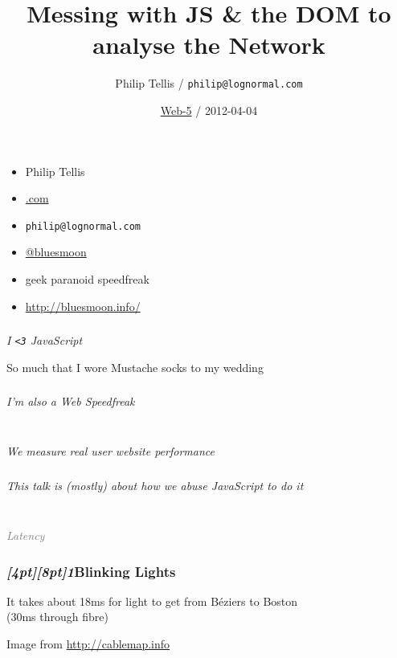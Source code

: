 \documentclass{beamer}
\author{Philip Tellis / \texttt{philip@lognormal.com}}
\title{Messing with JS \& the DOM to analyse the Network}
\date{\href{http://web-5.org/}{Web-5} / 2012-04-04}
\newcommand{\sn}[1]{\textrm{\textit{\Huge{\raisebox{-3pt}[4pt][8pt]{\textcolor{f2elblue}{#1}}}}}\hspace{4pt}}
\newcommand{\innersplash}[1]{
  \begin{center}
    \large \textrm{\textit{ #1 } }
  \end{center}
}
\newcommand{\splashslide}[2][{}]{
  \begin{frame}
  \frametitle{#1}
  \innersplash{#2}
  \end{frame}
}
\newcommand{\leadinslide}[2]{
  \splashslide{
     {\fontsize{150}{20}\selectfont{\raisebox{0pt}[90pt][0pt]{\textcolor{light-gray}{#1}}}} \\ \huge \textcolor{gray}{#2}
  }
}
\begin{document}
\begin{frame}
  \begin{itemize}
  \item Philip Tellis
  \item \href{http://www.lognormal.com/}{\textrm{\textcolor{med-gray}{.com}}}
  \item \small{\texttt{philip@lognormal.com}}
  \item \href{http://twitter.com/bluesmoon}{@bluesmoon}
  \item geek paranoid speedfreak
  \item \href{http://bluesmoon.info/}{http://bluesmoon.info/}
  \end{itemize}
\end{frame}

\splashslide{I \texttt{<3} JavaScript}

\begin{frame}{So much that I wore Mustache socks to my wedding}
\end{frame}

\splashslide{I'm also a Web Speedfreak}

\splashslide{ \\ We measure real user website performance}

\splashslide{This talk is (mostly) about how we abuse JavaScript to do it}

\begin{frame}
  \titlepage
\end{frame}

\leadinslide{1}{Latency}

\begin{frame}
\frametitle{\sn{1}Blinking Lights}
\vspace{6cm}
\begin{center}
It takes about 18ms for light to get from B\'{e}ziers to Boston \\
(30ms through fibre)
\end{center}
\vfill
\tiny Image from \href{http://cablemap.info/}{http://cablemap.info}
\end{frame}
\end{document}
